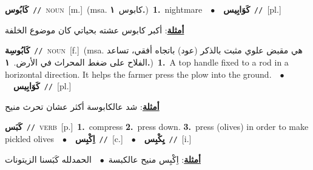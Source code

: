 \documentclass[10pt,a4paper,twoside]{article} %
\begin{document}
\begin{multicols}{2}
{\setlength\topsep{0pt}\textbf{\foreignlanguage{arabic}{كَابُوس}}\ {\color{gray}\texttt{//}\color{black}}\ \textsc{noun}\ [m.]\ \color{gray}(msa. \foreignlanguage{arabic}{كابوس}~\foreignlanguage{arabic}{\textbf{١.}})\color{black}\ \textbf{1.}~nightmare\ \ $\bullet$\ \ \setlength\topsep{0pt}\textbf{\foreignlanguage{arabic}{كَوَابِيس}}\ {\color{gray}\texttt{//}\color{black}}\ [pl.]\  \begin{flushright}\color{gray}\foreignlanguage{arabic}{\textbf{\underline{\foreignlanguage{arabic}{أمثلة}}}: أكبر كابوس عشته بحياتي كان موضوع الخلفة}\end{flushright}\color{black}} \vspace{2mm}

{\setlength\topsep{0pt}\textbf{\foreignlanguage{arabic}{كَابُوسِة}}\ {\color{gray}\texttt{//}\color{black}}\ \textsc{noun}\ [f.]\ \color{gray}(msa. \foreignlanguage{arabic}{هي مقبض علوي مثبت بالذكر (عود) باتجاه أفقي، تساعد الفلاح على ضغط المحراث في الأرض.}~\foreignlanguage{arabic}{\textbf{١.}})\color{black}\ \textbf{1.}~A top handle fixed to a rod in a horizontal direction. It helps the farmer press the plow into the ground.\ \ $\bullet$\ \ \setlength\topsep{0pt}\textbf{\foreignlanguage{arabic}{كَوَابِيس}}\ {\color{gray}\texttt{//}\color{black}}\ [pl.]\  \begin{flushright}\color{gray}\foreignlanguage{arabic}{\textbf{\underline{\foreignlanguage{arabic}{أمثلة}}}: شد عالكابوسة أكثر عشان تحرث منيح}\end{flushright}\color{black}} \vspace{2mm}

{\setlength\topsep{0pt}\textbf{\foreignlanguage{arabic}{كَبَس}}\ {\color{gray}\texttt{//}\color{black}}\ \textsc{verb}\ [p.]\ \textbf{1.}~compress  \textbf{2.}~press down.  \textbf{3.}~press (olives) in order to make pickled olives\ \ $\bullet$\ \ \setlength\topsep{0pt}\textbf{\foreignlanguage{arabic}{اِكْبِس}}\ {\color{gray}\texttt{//}\color{black}}\ [c.]\ \ $\bullet$\ \ \setlength\topsep{0pt}\textbf{\foreignlanguage{arabic}{يِكْبِس}}\ {\color{gray}\texttt{//}\color{black}}\ [i.]\  \begin{flushright}\color{gray}\foreignlanguage{arabic}{\textbf{\underline{\foreignlanguage{arabic}{أمثلة}}}: اِكْبِس منيح عالكبسة\ $\bullet$\ \  الحمدلله كَبَسنا الزيتونات}\end{flushright}\color{black}} \vspace{2mm}


\end{multicols}
\end{document}
